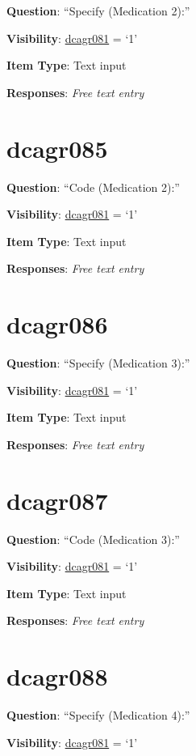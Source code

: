 \documentclass[]{book}
\begin{document}
\textbf{Question}: ``Specify (Medication 2):''

\textbf{Visibility}: \protect\hyperlink{dcagr081}{dcagr081} = `1'

\textbf{Item Type}: Text input

\textbf{Responses}: \emph{Free text entry}

\hypertarget{dcagr085}{%
\section{dcagr085}\label{dcagr085}}

\textbf{Question}: ``Code (Medication 2):''

\textbf{Visibility}: \protect\hyperlink{dcagr081}{dcagr081} = `1'

\textbf{Item Type}: Text input

\textbf{Responses}: \emph{Free text entry}

\hypertarget{dcagr086}{%
\section{dcagr086}\label{dcagr086}}

\textbf{Question}: ``Specify (Medication 3):''

\textbf{Visibility}: \protect\hyperlink{dcagr081}{dcagr081} = `1'

\textbf{Item Type}: Text input

\textbf{Responses}: \emph{Free text entry}

\hypertarget{dcagr087}{%
\section{dcagr087}\label{dcagr087}}

\textbf{Question}: ``Code (Medication 3):''

\textbf{Visibility}: \protect\hyperlink{dcagr081}{dcagr081} = `1'

\textbf{Item Type}: Text input

\textbf{Responses}: \emph{Free text entry}

\hypertarget{dcagr088}{%
\section{dcagr088}\label{dcagr088}}

\textbf{Question}: ``Specify (Medication 4):''

\textbf{Visibility}: \protect\hyperlink{dcagr081}{dcagr081} = `1'
\end{document}
